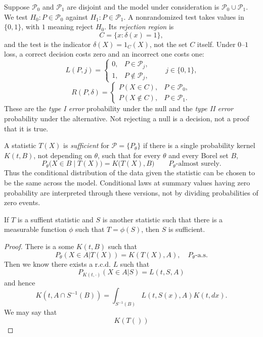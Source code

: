 \begin{definition}
Suppose $\mathcal P_0$ and $\mathcal P_1$ are disjoint and the model under
consideration is $\mathcal P_0\cup\mathcal P_1$. We test
$H_0:P\in\mathcal P_0$ against $H_1:P\in\mathcal P_1$.
A nonrandomized test takes values in $\{0,1\}$, with $1$ meaning reject
$H_0$. Its \emph{rejection region} is
\[
C=\{x:\delta(x)=1\},
\]
and the test is the indicator $\delta(X)=1_C(X)$, not the set $C$ itself.
Under $0$--$1$ loss, a correct decision costs zero and an incorrect one
costs one:
\[
L(P,j)=
\begin{cases}
0, & P\in\mathcal P_j,\\
1, & P\notin\mathcal P_j,
\end{cases}
\qquad j\in\{0,1\},
\]
\[
R(P,\delta)=
\begin{cases}
P(X\in C), & P\in\mathcal P_0,\\
P(X\notin C), & P\in\mathcal P_1.
\end{cases}
\]
These are the \emph{type I error} probability under the null and the
\emph{type II error} probability under the alternative. Not rejecting a
null is a decision, not a proof that it is true.
\end{definition}

\begin{definition}
A statistic $T(X)$ is \emph{sufficient} for $\mathcal P=\{P_\theta\}$ if
there is a single probability kernel $K(t,B)$, not depending on $\theta$,
such that for every $\theta$ and every Borel set $B$,
\[
P_\theta\bigl(X\in B\mid T(X)\bigr)
=K\bigl(T(X),B\bigr)
\qquad P_\theta\text{-almost surely}.
\]
Thus the conditional distribution of the data given the statistic can be
chosen to be the same across the model. Conditional laws at summary values
having zero probability are interpreted through these versions, not by
dividing probabilities of zero events.
\end{definition}

\begin{theorem}
    If $T$ is a suffient statistic and $S$ is another statistic such that there is a measurable function $\phi$ such that $T = \phi(S)$, then $S$ is sufficient.
\end{theorem}
\begin{proof}
    There is a some $K(t,B)$ such that
    \[
    P_{\theta}(X \in A|T(X)) = K(T(X),A),\quad P_{\theta}\text{-a.s.}
    \]
    Then we know there exists a r.c.d. $L$ such that
    \[
    P_{K(t,\cdot)}(X \in A|S) = L(t,S,A)
    \]
    and hence
    \[
    K(t,A\cap S^{-1}(B)) = \int_{S^{-1}(B)} L(t,S(x),A)K(t,dx).
    \]
    We may say that
    \[
    K(T())
    \]
\end{proof}

